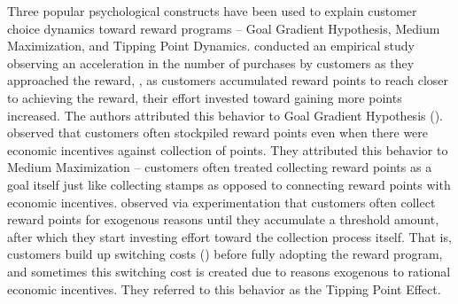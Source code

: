 Three popular psychological constructs have been used to explain customer choice dynamics toward reward programs -- Goal Gradient Hypothesis, Medium Maximization, and Tipping Point Dynamics.
\cite{kivetz2006goal} conducted an empirical study observing an acceleration in the number of purchases by customers as they approached the reward, \ie, as customers accumulated reward points to reach closer to achieving the reward, their effort invested toward gaining more points increased. 
The authors attributed this behavior to Goal Gradient Hypothesis (\cite{hull1932goal}).
\cite{stourm2015stockpiling, dreze2004using} observed that customers often stockpiled reward points even when there were economic incentives against collection of points. They attributed this behavior to Medium Maximization -- customers often treated collecting reward points as a goal itself just like collecting stamps as opposed to connecting reward points with economic incentives.
\cite{gao2014influence} observed via experimentation that customers often collect reward points for exogenous reasons until they accumulate a threshold amount, after which they start investing effort toward the collection process itself.
That is, customers build up switching costs (\cite{klemperer1995competition}) before fully adopting the reward program, and sometimes this switching cost is created due to reasons exogenous to rational economic incentives.
They referred to this behavior as the Tipping Point Effect.

